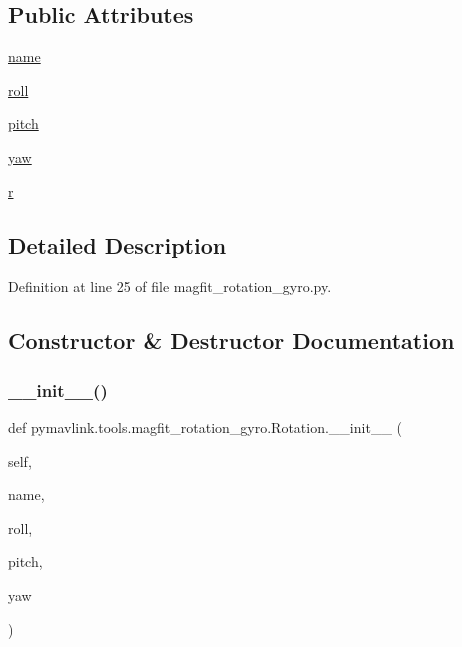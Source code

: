 \subsection*{Public Attributes}
\begin{DoxyCompactItemize}
\item 
\mbox{\hyperlink{classpymavlink_1_1tools_1_1magfit__rotation__gyro_1_1Rotation_a35ff5b76a58e457f04b53806305a78b8}{name}}
\item 
\mbox{\hyperlink{classpymavlink_1_1tools_1_1magfit__rotation__gyro_1_1Rotation_a87366b9bb41c2b076b1bbe7a4fefb3c7}{roll}}
\item 
\mbox{\hyperlink{classpymavlink_1_1tools_1_1magfit__rotation__gyro_1_1Rotation_a8d07ae7ab64afb5cada12087248ec304}{pitch}}
\item 
\mbox{\hyperlink{classpymavlink_1_1tools_1_1magfit__rotation__gyro_1_1Rotation_a042cd272704a4136a52a3889f9e77266}{yaw}}
\item 
\mbox{\hyperlink{classpymavlink_1_1tools_1_1magfit__rotation__gyro_1_1Rotation_a2181e0e89c6aaf31a073b4ba66fb5f49}{r}}
\end{DoxyCompactItemize}


\subsection{Detailed Description}


Definition at line 25 of file magfit\+\_\+rotation\+\_\+gyro.\+py.



\subsection{Constructor \& Destructor Documentation}
\mbox{\label{classpymavlink_1_1tools_1_1magfit__rotation__gyro_1_1Rotation_accac6f6ca7fb0d96a8e61d64e4e180a7}} 
\subsubsection{\texorpdfstring{\_\_init\_\_()}{\_\_init\_\_()}}
{\footnotesize\ttfamily def pymavlink.\+tools.\+magfit\+\_\+rotation\+\_\+gyro.\+Rotation.\+\_\+\+\_\+init\+\_\+\+\_\+ (\begin{DoxyParamCaption}\item[{}]{self,  }\item[{}]{name,  }\item[{}]{roll,  }\item[{}]{pitch,  }\item[{}]{yaw }\end{DoxyParamCaption})}



